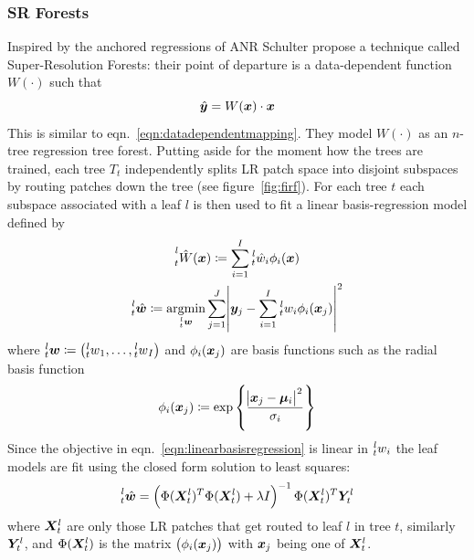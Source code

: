 \subsubsection{SR Forests}
Inspired by the anchored regressions of ANR Schulter \etal\cite{Schulter2015} propose a technique called Super-Resolution Forests: their point of departure is a data-dependent function \(W(\cdot)\) such that
\begin{equation}
    \hat{\bm{y}} = W(\bm{x}) \cdot \bm{x}
\end{equation}
This is similar to eqn.~\eqref{eqn:datadependentmapping}.
%
They model \(W(\cdot)\) as an \(n\)-tree regression tree forest.
%
Putting aside for the moment how the trees are trained, each tree \(T_t\) independently splits LR patch space into disjoint subspaces by routing patches down the tree (see figure~\ref{fig:firf}).
%
For each tree \(t\) each subspace associated with a leaf \(l\) is then used to fit a linear basis-regression model defined by
\begin{gather}
    \prescript{l}{t}{\hat{W}(\bm{x})} \coloneqq \sum_{i=1}^I \prescript{l}{t}{\hat{w}_i}\phi_i(\bm{x}) \\
    \prescript{l}{t}{\hat{\bm{w}}} \coloneqq \underset{\prescript{l}{t}{\bm{w}}}{\text{argmin}} \sum_{j=1}^J \abs{ \bm{y}_j - \sum_{i=1}^I \prescript{l}{t}{w_i}\phi_i(\bm{x}_j) }^2
    \label{eqn:linearbasisregression}
\end{gather}
where \(\prescript{l}{t}{\bm{w}} \coloneqq \left( \prescript{l}{t}{w}_1, \mathellipsis, \prescript{l}{t}{w}_I \right)\) and \(\phi_i(\bm{x}_j)\) are basis functions such as the radial basis function
\begin{equation}
    \phi_i(\bm{x}_j) \coloneqq \exp \left\{ \frac{\abs{ \bm{x}_j - \bm{\mu}_i }^2}{\sigma_i} \right\}
\end{equation}
Since the objective in eqn.~\eqref{eqn:linearbasisregression} is linear in \(\prescript{l}{t}{w}_i\) the leaf models are fit using the closed form solution to least squares:
\begin{equation}
    \prescript{l}{t}{\hat{\bm{w}}} = \left( \Phi(\bm{X}_t^l)^T \Phi(\bm{X}_t^l) + \lambda I \right)^{-1} \Phi(\bm{X}_t^l)^T \bm{Y}_t^l
\end{equation}
where \(\bm{X}_t^l\) are only those LR patches that get routed to leaf \(l\) in tree \(t\), similarly \(\bm{Y}_t^l\), and \(\Phi(\bm{X}_t^l)\) is the matrix \(\left( \phi_i(\bm{x}_j) \right)\) with \(\bm{x}_j\) being one of \(\bm{X}_t^l\).
%
